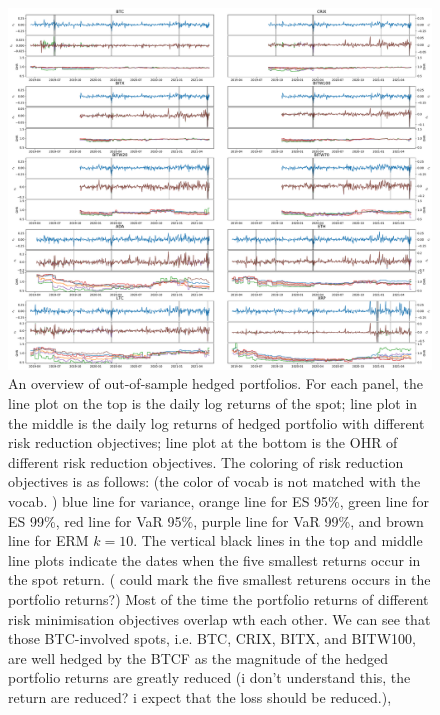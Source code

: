 \begin{figure}[ht]
    \centering
    \includegraphics[width=\textwidth]{_pics/overview.pdf}
  \caption{An overview of out-of-sample hedged portfolios.
            For each panel, the line plot on the top is the daily log returns of the spot;
            line plot in the middle is the daily log returns of hedged portfolio with different risk reduction objectives;
            line plot at the bottom is the OHR of different risk reduction objectives. The coloring of risk reduction objectives is as follows:  \textcolor{plt4}{(the color of vocab is not matched with the vocab. )}      
                                      \textcolor{plt1}{blue line} for variance,
                                      \textcolor{plt2}{orange line} for ES 95\%,
                                      \textcolor{plt3}{green line} for ES 99\%,
                                      \textcolor{plt4}{red line} for VaR 95\%,
                                      \textcolor{plt5}{purple line} for VaR 99\%, and
                                      \textcolor{plt6}{brown line} for ERM $k=10$.
            The vertical black lines in the top and middle line plots indicate the dates when the five smallest returns occur in the spot return. \textcolor{plt4}{( could mark the five smallest returens occurs in the portfolio returns?)}
            Most of the time the portfolio returns of different risk minimisation objectives overlap wth each other.
            We can see that those BTC-involved spots, i.e. BTC, CRIX, BITX, and BITW100,  are well hedged by the BTCF as the magnitude of the hedged portfolio returns are greatly reduced \textcolor{plt4}{(i don't understand this, the return are reduced? i expect that the loss should be reduced.)},
}
\end{figure}
